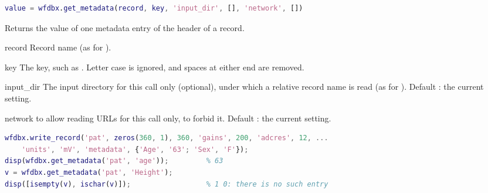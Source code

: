 \begin{lstlisting}[language=Matlab,style=signature]
value = wfdbx.get_metadata(record, key, 'input_dir', [], 'network', [])
\end{lstlisting}
Returns the value of one metadata entry of the header of a record.
\begin{params}
\item[record] Record name (as for ).
\item[key] The key, such as . Letter case is ignored, and spaces at either end
  are removed.
\item[input\_dir] The input directory for this call only (optional), under which a
  relative record name is read (as for ). Default \code{[]}:
  the current setting.
\item[network]  to allow reading URLs for this call only,  to
  forbid it. Default \code{[]}: the current setting.
\end{params}
\begin{lstlisting}[language=Matlab,style=example]
wfdbx.write_record('pat', zeros(360, 1), 360, 'gains', 200, 'adcres', 12, ...
    'units', 'mV', 'metadata', {'Age', '63'; 'Sex', 'F'});
disp(wfdbx.get_metadata('pat', 'age'));         % 63
v = wfdbx.get_metadata('pat', 'Height');
disp([isempty(v), ischar(v)]);                  % 1 0: there is no such entry
\end{lstlisting}

